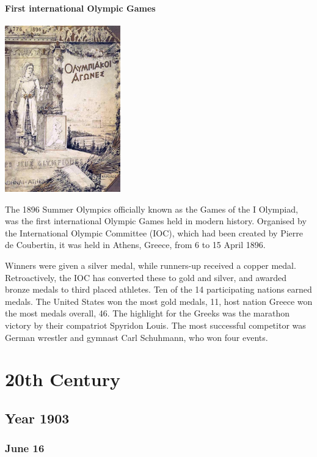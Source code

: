 \documentclass[11pt]{report}
\begin{document}
\subsection{First international Olympic Games}
\vspace{2mm}\begin{center}\includegraphics[width=5cm]{./img/olgames.jpg}\end{center}
The 1896 Summer Olympics officially known as the Games of the I Olympiad, was the first international Olympic Games held in modern history. Organised by the International Olympic Committee (IOC), which had been created by Pierre de Coubertin, it was held in Athens, Greece, from 6 to 15 April 1896.

Winners were given a silver medal, while runners-up received a copper medal. Retroactively, the IOC has converted these to gold and silver, and awarded bronze medals to third placed athletes. Ten of the 14 participating nations earned medals. The United States won the most gold medals, 11, host nation Greece won the most medals overall, 46. The highlight for the Greeks was the marathon victory by their compatriot Spyridon Louis. The most successful competitor was German wrestler and gymnast Carl Schuhmann, who won four events.




										
			
\part{20th Century}
\chapter{Year 1903}
\section{June 16}
\end{document}
